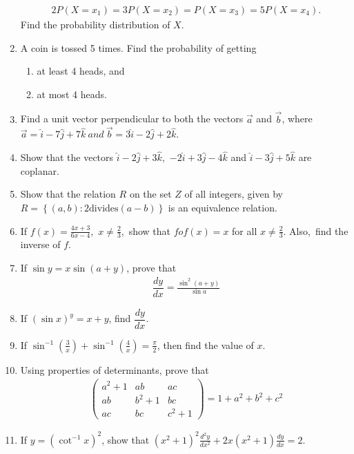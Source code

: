\documentclass[10pt,-letter paper]{article}
\providecommand{\cbrak}[1]{\ensuremath{\left\{#1\right\}}}
\providecommand{\brak}[1]{\ensuremath{\left(#1\right)}}
\newcommand{\myvec}[1]{\ensuremath{\begin{pmatrix}#1\end{pmatrix}}}
\begin{document}
\begin{enumerate}
\begin{align*}
		2P\brak{X = x_1} = 3P\brak{X = x_2} = P\brak{X = x_3} = 5P\brak{X = x_4}.
	\end{align*}
		Find the probability distribution of ${X}$.
\item A coin is tossed 5 times. Find the probability of getting 
	\begin{enumerate}[label = (\roman*)]
		\item at least 4 heads, and 
		\item at most 4 heads.
	\end{enumerate}
\item Find a unit vector perpendicular to both the vectors $\overrightarrow{a}$ and $\overrightarrow{b}$, where $\overrightarrow{a} = \hat{i} - 7\hat{j} + 7\hat{k}~and~\overrightarrow{b} = 3\hat{i} - 2\hat{j} + 2\hat{k}$.
\item Show that the vectors $\hat{i} - 2\hat{j} + 3\hat{k},$ $ - 2\hat{i} + 3\hat{j} - 4\hat{k}$ and $\hat{i} - 3\hat{j} + 5\hat{k}$ are coplanar.
\item Show that the relation $R$ on the set $Z$ of all integers, given by $R = \cbrak{\brak{a,b} :2 \text{divides} \brak{a-b}}$ is an equivalence relation.
\item If $f\brak{x}= \frac{4{x} + 3}{6{x} - 4}$,~${x} \neq\frac{2}{3}$,~show that $fof\brak{x} = {x}$ for all ${x} \neq\frac{2}{3}$. Also,~find the inverse of ${f}$.
\item If $\sin{y} = x\sin{\brak{a + y}}$, prove that 
	\begin{align*}
		\dfrac{dy}{dx} = \frac{\sin^{2}\brak{a + y}}{\sin{a}}
	\end{align*}
\item If $\brak{\sin x}^y = {x + y}$, find $\dfrac{dy}{dx}$.
\item If $\sin^{-1}\brak{\frac{3}{x}} + \sin^{-1}\brak{\frac{4}{x}} = \frac{\pi}{2}$, then find the value of $x$.
\item Using properties of determinants, prove that
	\begin{align*}
		\myvec{{a}^2 + {1} & {a}{b} & {a}{c} \\ {a}{b} & {b}^2+{1} & {b}{c} \\ {a}{c} & {b}{c} & {c}^2+{1}} = 1+{a}^2+{b}^2+{c}^2
	\end{align*}

\item If $y = \brak{{\cot^{-1}{x}}}^2$, show that $\brak{{x}^2+{1}}^2\frac{d^2y}{dx^2} + 2{x} \brak{{x^2}+{1}} \frac{dy}{dx} = 2$.


\end{enumerate}
\end{document}
